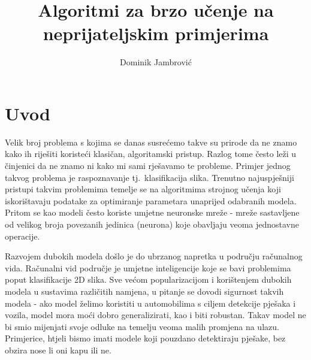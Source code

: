 \documentclass[times, utf8, zavrsni, numeric]{fer}
\begin{document}
\makeatletter
\renewcommand{\ALG@name}{Algoritam}
\makeatother


\title{Algoritmi za brzo učenje na neprijateljskim primjerima}

\author{Dominik Jambrović}

\maketitle

% 


\tableofcontents

\chapter{Uvod}
Velik broj problema s kojima se danas susrećemo takve su prirode da ne znamo kako ih riješiti koristeći klasičan, algoritamski pristup. Razlog tome često leži u činjenici da ne znamo ni kako mi sami rješavamo te probleme.
Primjer jednog takvog problema je raspoznavanje tj.\ klasifikacija slika.
Trenutno najuspješniji pristupi takvim problemima temelje se na algoritmima strojnog učenja koji iskorištavaju podatake za optimiranje parametara unaprijed odabranih modela.
Pritom se kao modeli često koriste umjetne neuronske mreže - mreže sastavljene od velikog broja povezanih jedinica (neurona) koje obavljaju veoma jednostavne operacije.

Razvojem dubokih modela došlo je do ubrzanog napretka u području računalnog vida. Računalni vid područje je umjetne inteligencije koje se bavi problemima poput klasifikacije 2D slika. 
Sve većom popularizacijom i korištenjem dubokih modela u sustavima različitih namjena, u pitanje se dovodi sigurnost takvih modela -
ako model želimo koristiti u automobilima s ciljem detekcije pješaka i vozila, model mora moći dobro generalizirati, kao i biti robustan. Takav model ne bi smio mijenjati svoje odluke na temelju veoma malih promjena na ulazu.
Primjerice, htjeli bismo imati modele koji pouzdano detektiraju pješake, bez obzira nose li oni kapu ili ne.
\end{document}
